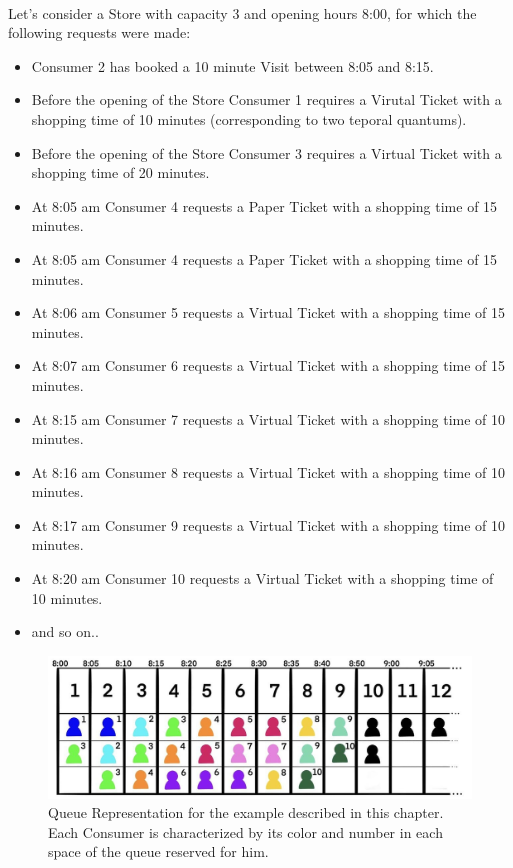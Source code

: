\documentclass[a4paper, 12pt, oneside, table]{article}
\begin{document}
\\
Let's consider a Store with capacity 3 and opening hours 8:00, for which the following requests were made:
\begin{itemize}
    \item Consumer 2 has booked a 10 minute Visit between 8:05 and 8:15.
    \item Before the opening of the Store Consumer 1 requires a Virutal Ticket with a shopping time of 10 minutes (corresponding to two teporal quantums).
    \item Before the opening of the Store Consumer 3 requires a Virtual Ticket with a shopping time of 20 minutes.
    \item At 8:05 am Consumer 4 requests a Paper Ticket with a shopping time of 15 minutes.
    \item At 8:05 am Consumer 4 requests a Paper Ticket with a shopping time of 15 minutes.
    \item At 8:06 am Consumer 5 requests a Virtual Ticket with a shopping time of 15 minutes.
    \item At 8:07 am Consumer 6 requests a Virtual Ticket with a shopping time of 15 minutes.
    \item At 8:15 am Consumer 7 requests a Virtual Ticket with a shopping time of 10 minutes.
    \item At 8:16 am Consumer 8 requests a Virtual Ticket with a shopping time of 10 minutes.
    \item At 8:17 am Consumer 9 requests a Virtual Ticket with a shopping time of 10 minutes.
    \item At 8:20 am Consumer 10 requests a Virtual Ticket with a shopping time of 10 minutes.
    \item and so on..
\end{itemize}
\begin{figure}[hbt]
\centering
	\centering
  	\includegraphics[height=0.15\textheight, scale=0.2, keepaspectratio]{img/queue/queue_ex1.jpg} 
	\caption{Queue Representation for the example described in this chapter. Each Consumer is characterized by its color and number in each space of the queue reserved for him.}
 	\label{queueex1}
\end{figure}
\end{document}
